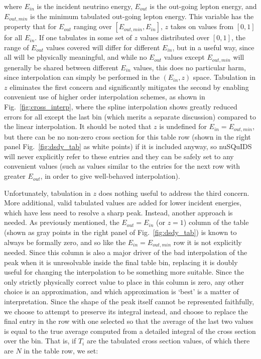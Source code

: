 \documentclass[3p,12pt]{elsarticle}
\newcommand{\ttf}{\ttfamily}
\begin{document}
where $E_{in}$ is the incident neutrino energy, $E_{out}$ is the out-going lepton energy, and $E_{out,min}$ is the minimum tabulated out-going lepton energy. 
This variable has the property that for $E_{out}$ ranging over $[E_{out,min}, E_{in}]$, $z$ takes on values from $[0, 1]$ for all $E_{in}$. 
If one tabulates in some set of $z$ values distributed over $[0, 1]$, the range of $E_{out}$ values covered will differ for different $E_{in}$, but in a useful way, since all will be physically meaningful, and while no $E_{out}$ values except $E_{out,min}$ will generally be shared between different $E_{in}$ values, this does no particular harm, since interpolation can simply be performed in the $(E_{in}, z)$ space. 
Tabulation in $z$ eliminates the first concern and significantly mitigates the second by enabling convenient use of higher order interpolation schemes, as shown in Fig.~\ref{fig:cross_interp}, where the spline interpolation shows greatly reduced errors for all except the last bin (which merits a separate discussion) compared to the linear interpolation. 
It should be noted that $z$ is undefined for $E_{in} = E_{out,min}$, but there can be no non-zero cross section for this table row (shown in the right panel Fig.~\ref{fig:dsdy_tab} as white points) if it is included anyway, so {\ttf nuSQuIDS} will never explicitly refer to these entries and they can be safely set to any convenient values (such as values similar to the entries for the next row with greater $E_{out}$, in order to give well-behaved interpolation). 

Unfortunately, tabulation in $z$ does nothing useful to address the third concern. 
More additional, valid tabulated values are added for lower incident energies, which have less need to resolve a sharp peak. 
Instead, another approach is needed. 
As previously mentioned, the $E_{out} = E_{in}$ (or $z = 1$) column of the table (shown as gray points in the right panel of Fig.~\ref{fig:dsdy_tab}) is known to always be formally zero, and so like the $E_{in} = E_{out,min}$ row it is not explicitly needed. 
Since this column is also a major driver of the bad interpolation of the peak when it is unresolvable inside the final table bin, replacing it is doubly useful for changing the interpolation to be something more suitable. 
Since the only strictly physically correct value to place in this column is zero, any other choice is an approximation, and which approximation is `best' is a matter of interpretation. 
Since the shape of the peak itself cannot be represented faithfully, we choose to attempt to preserve its integral instead, and choose to replace the final entry in the row with one selected so that the average of the last two values is equal to the true average computed from a detailed integral of the cross section over the bin. 
That is, if $T_i$ are the tabulated cross section values, of which there are $N$ in the table row, we set:
\end{document}
